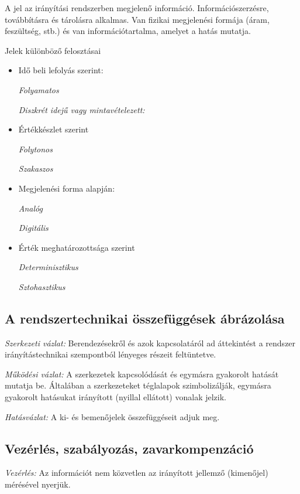 \documentclass[a4paper,12pt]{book}
\begin{document}
A jel az irányítási rendszerben megjelenő információ. Információszerzésre, továbbításra és tárolásra alkalmas. 
Van fizikai megjelenési formája (áram, feszültség, stb.) és van információtartalma, amelyet a hatás mutatja. 

\noindent Jelek különböző felosztásai 
\begin{itemize}
\item{Idő beli lefolyás szerint:}

\emph{Folyamatos}

\emph{Diszkrét idejű vagy mintavételezett:}

\item{Értékkészlet szerint}
 
\emph{Folytonos}

\emph{Szakaszos}

\item{Megjelenési forma alapján:}

\emph{Analóg}

\emph{Digitális}

\item{Érték meghatározottsága szerint}

\emph{Determinisztikus}

\emph{Sztohasztikus}

\end{itemize}

\subsection*{A rendszertechnikai összefüggések ábrázolása}

\emph{Szerkezeti vázlat: } Berendezésekről és azok kapcsolatáról ad áttekintést a rendszer irányítástechnikai szempontból
lényeges részeit feltüntetve. 

\emph{Működési vázlat: } A szerkezetek kapcsolódását és egymásra gyakorolt hatását mutatja be. Általában a szerkezeteket 
téglalapok szimbolizálják, egymásra gyakorolt hatásukat irányított (nyillal ellátott) vonalak jelzik. 

\emph{Hatásvázlat:} A ki- és bemenőjelek összefüggéseit adjuk meg. 

\subsection*{Vezérlés, szabályozás, zavarkompenzáció}

\emph{Vezérlés:} Az információt nem közvetlen az irányított jellemző (kimenőjel) mérésével nyerjük. 
\end{document}
